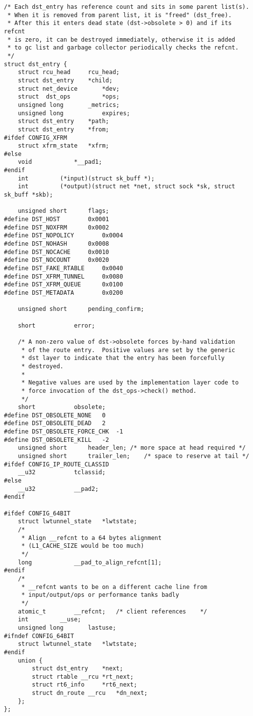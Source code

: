 \begin{verbatim}
/* Each dst_entry has reference count and sits in some parent list(s).
 * When it is removed from parent list, it is "freed" (dst_free).
 * After this it enters dead state (dst->obsolete > 0) and if its refcnt
 * is zero, it can be destroyed immediately, otherwise it is added
 * to gc list and garbage collector periodically checks the refcnt.
 */
struct dst_entry {
    struct rcu_head     rcu_head;
    struct dst_entry    *child;
    struct net_device       *dev;
    struct  dst_ops         *ops;
    unsigned long       _metrics;
    unsigned long           expires;
    struct dst_entry    *path;
    struct dst_entry    *from;
#ifdef CONFIG_XFRM
    struct xfrm_state   *xfrm;
#else
    void            *__pad1;
#endif
    int         (*input)(struct sk_buff *);
    int         (*output)(struct net *net, struct sock *sk, struct sk_buff *skb);

    unsigned short      flags;
#define DST_HOST        0x0001
#define DST_NOXFRM      0x0002
#define DST_NOPOLICY        0x0004
#define DST_NOHASH      0x0008
#define DST_NOCACHE     0x0010
#define DST_NOCOUNT     0x0020
#define DST_FAKE_RTABLE     0x0040
#define DST_XFRM_TUNNEL     0x0080
#define DST_XFRM_QUEUE      0x0100
#define DST_METADATA        0x0200

    unsigned short      pending_confirm;

    short           error;

    /* A non-zero value of dst->obsolete forces by-hand validation
     * of the route entry.  Positive values are set by the generic
     * dst layer to indicate that the entry has been forcefully
     * destroyed.
     *
     * Negative values are used by the implementation layer code to
     * force invocation of the dst_ops->check() method.
     */
    short           obsolete;
#define DST_OBSOLETE_NONE   0
#define DST_OBSOLETE_DEAD   2
#define DST_OBSOLETE_FORCE_CHK  -1
#define DST_OBSOLETE_KILL   -2
    unsigned short      header_len; /* more space at head required */
    unsigned short      trailer_len;    /* space to reserve at tail */
#ifdef CONFIG_IP_ROUTE_CLASSID
    __u32           tclassid;
#else
    __u32           __pad2;
#endif

#ifdef CONFIG_64BIT
    struct lwtunnel_state   *lwtstate;
    /*
     * Align __refcnt to a 64 bytes alignment
     * (L1_CACHE_SIZE would be too much)
     */
    long            __pad_to_align_refcnt[1];
#endif
    /*
     * __refcnt wants to be on a different cache line from
     * input/output/ops or performance tanks badly
     */
    atomic_t        __refcnt;   /* client references    */
    int         __use;
    unsigned long       lastuse;
#ifndef CONFIG_64BIT
    struct lwtunnel_state   *lwtstate;
#endif
    union {
        struct dst_entry    *next;
        struct rtable __rcu *rt_next;
        struct rt6_info     *rt6_next;
        struct dn_route __rcu   *dn_next;
    };
};
\end{verbatim}

